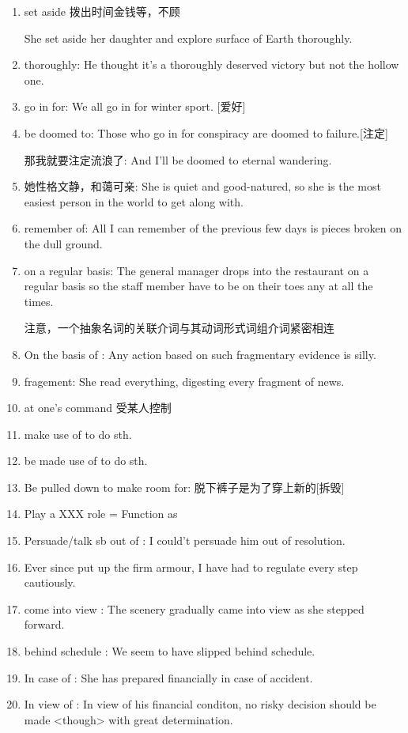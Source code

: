\documentclass[utf8]{ctexart}
\begin{document}
\begin{enumerate}
			\item set aside 拨出时间金钱等，不顾
			\par She set aside her daughter and explore surface of Earth thoroughly.		
				\item thoroughly: He thought it's a thoroughly deserved victory but not the hollow one.
				\item go in for: We all go in for winter sport. [爱好]	
				\item be doomed to: Those who go in for conspiracy are doomed to failure.[注定]
						\par 那我就要注定流浪了: And I'll be doomed to eternal wandering.
			    \item 她性格文静，和蔼可亲: She is quiet and good-natured, so she is the most easiest person in the world to get along with.
			    \item remember of: All I can remember of the previous few days is pieces broken on the dull ground.		
			    \item on a regular basis: The general manager drops into the restaurant on a regular basis so the staff member have to be on their toes any at all the times.
						\par 注意，一个抽象名词的关联介词与其动词形式词组介词紧密相连
				\item On the basis of : Any action based on such fragmentary evidence is silly.
				\item fragement: She read everything, digesting every fragment of news.
                \item at one's command 受某人控制
		        \item make use of to do sth. 
		        \item be made use of to do sth.	
				\item Be pulled down to make room for: 脱下裤子是为了穿上新的[拆毁]	
				\item Play a XXX role = Function as	
				\item Persuade/talk sb out of : I could't persuade him out of resolution.	
				\item Ever since put up the firm armour, I have had to regulate every step cautiously.	
				\item come into view : The scenery gradually came into view as she stepped forward. 	
				\item behind schedule : We seem to have slipped behind schedule.
				\item In case of : She has prepared financially in case of accident.
				\item In view of : In view of his financial conditon, no risky decision should be made <though> with great determination. 		

\end{enumerate}
\end{document}
